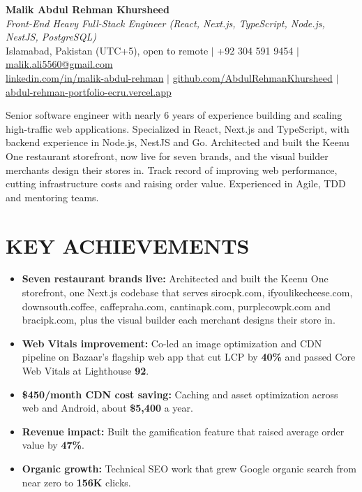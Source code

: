 \documentclass[letterpaper,11pt]{article}
\newcommand{\resumeItem}[1]{\item\small{#1\vspace{-2pt}}}
\newcommand{\resumeBulletsStart}{\begin{itemize}[leftmargin=0.3in]}
\newcommand{\resumeBulletsEnd}{\end{itemize}\vspace{-4pt}}
\begin{document}
\begin{center}
  {\LARGE \textbf{Malik Abdul Rehman Khursheed}} \\ \vspace{3pt}
  \textit{Front-End Heavy Full-Stack Engineer (React, Next.js, TypeScript, Node.js, NestJS, PostgreSQL)} \\ \vspace{3pt}
  \small Islamabad, Pakistan (UTC+5), open to remote $|$
  +92 304 591 9454 $|$
  \href{mailto:malik.ali5560@gmail.com}{malik.ali5560@gmail.com} \\ \vspace{1pt}
  \href{https://www.linkedin.com/in/malik-abdul-rehman}{linkedin.com/in/malik-abdul-rehman} $|$
  \href{https://github.com/AbdulRehmanKhursheed}{github.com/AbdulRehmanKhursheed} $|$
  \href{https://abdul-rehman-portfolio-ecru.vercel.app}{abdul-rehman-portfolio-ecru.vercel.app}
\end{center}

\vspace{-4pt}
\small Senior software engineer with nearly 6 years of experience building and scaling high-traffic web
applications. Specialized in React, Next.js and TypeScript, with backend experience in Node.js, NestJS
and Go. Architected and built the Keenu One restaurant storefront, now live for seven brands, and the
visual builder merchants design their stores in. Track record of improving web performance, cutting
infrastructure costs and raising order value. Experienced in Agile, TDD and mentoring teams.

\section{KEY ACHIEVEMENTS}
\resumeBulletsStart
    \resumeItem{\textbf{Seven restaurant brands live:} Architected and built the Keenu One storefront, one Next.js codebase that serves sirocpk.com, ifyoulikecheese.com, downsouth.coffee, caffepraha.com, cantinapk.com, purplecowpk.com and bracipk.com, plus the visual builder each merchant designs their store in.}
    \resumeItem{\textbf{Web Vitals improvement:} Co-led an image optimization and CDN pipeline on Bazaar's flagship web app that cut LCP by \textbf{40\%} and passed Core Web Vitals at Lighthouse \textbf{92}.}
    \resumeItem{\textbf{\$450/month CDN cost saving:} Caching and asset optimization across web and Android, about \textbf{\$5,400} a year.}
    \resumeItem{\textbf{Revenue impact:} Built the gamification feature that raised average order value by \textbf{47\%}.}
    \resumeItem{\textbf{Organic growth:} Technical SEO work that grew Google organic search from near zero to \textbf{156K} clicks.}
\resumeBulletsEnd
\end{document}

